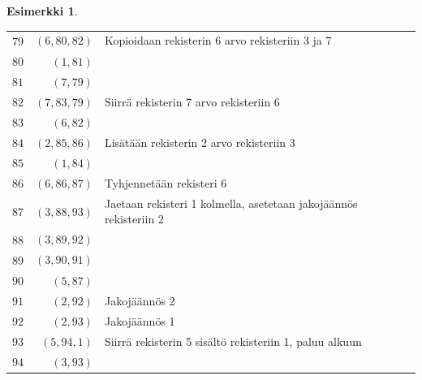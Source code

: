 \documentclass[a4paper, 12pt]{article}
\theoremstyle{definition}
\newtheorem{example}[mydef]{Esimerkki}
\theoremstyle{plain}
\begin{document}
\begin{example}
\begin{center}
\begin{tabular}[t]{r|r|l}
$\hat{79}$ & $(6, 80, 82)$  & Kopioidaan rekisterin 6 arvo rekisteriin 3 ja 7\\
$\hat{80}$ & $(1, 81)$  &\\
$\hat{81}$ & $(7, 79)$  &\\
$\hat{82}$ & $(7, 83, 79)$ & Siirrä rekisterin 7 arvo rekisteriin 6 \\
$\hat{83}$ & $(6, 82)$  &\\
$\hat{84}$ & $(2, 85, 86)$  & Lisätään rekisterin 2 arvo rekisteriin 3\\
$\hat{85}$ & $(1, 84)$  &\\
$\hat{86}$ & $(6, 86, 87)$  & Tyhjennetään rekisteri 6\\
$\hat{87}$ & $(3, 88, 93)$  & Jaetaan rekisteri 1 kolmella, asetetaan jakojäännös rekisteriin 2\\
$\hat{88}$ & $(3, 89, 92)$  & \\
$\hat{89}$ & $(3, 90, 91)$  & \\
$\hat{90}$ & $(5, 87)$  & \\
$\hat{91}$ & $(2, 92)$  & Jakojäännös 2 \\
$\hat{92}$ & $(2, 93)$  & Jakojäännös 1 \\
$\hat{93}$ & $(5, 94, 1)$  & Siirrä rekisterin 5 sisältö rekisteriin 1, paluu alkuun \\
$\hat{94}$ & $(3, 93)$  & \\
\end{tabular}
\end{center}

\end{example}
\end{document}
